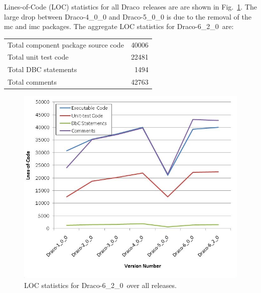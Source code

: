 \documentclass[note]{ResearchNote_pdf}
\newcommand{\draco}{Draco}
\newcommand{\dracor}{\draco-6\_2\_0}
\begin{document}


Lines-of-Code (LOC) statistics for all \draco\ releases are are shown
in Fig.~\ref{fig:stats}.  The large drop between \draco-4\_0\_0 and
\draco-5\_0\_0 is due to the removal of the \textsf{mc} and
\textsf{imc} packages. The aggregate LOC statistics for \dracor\ are:
\begin{center}
  \begin{tabular}{|l|r|} \hline
    Total component package source code & 40006 \\
    Total unit test code & 22481 \\
    Total DBC statements & 1494 \\
    Total comments & 42763 \\
    \hline
  \end{tabular}
\end{center}

\begin{figure}
  \centerline{
    \includegraphics[width=4.5in]{loc-6_2_0.jpg}}
  \caption{LOC statistics for \dracor\ over all releases.}
  \label{fig:stats}
\end{figure}
\end{document}
